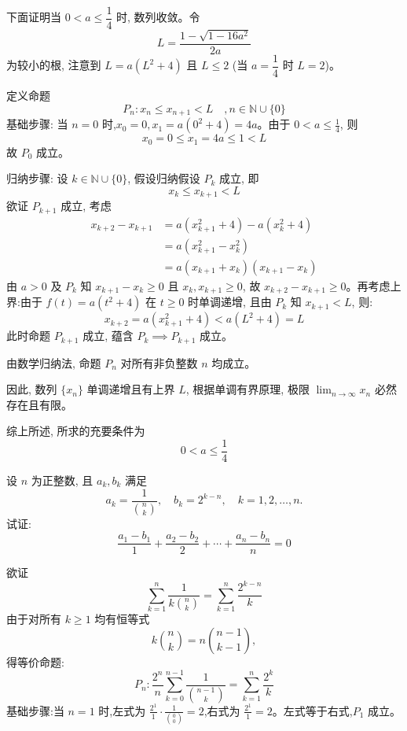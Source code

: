 \begin{questions}
\begin{solution}
        下面证明当 $0 < a \le \dfrac{1}{4}$ 时, 数列收敛。令 
        \[
        L = \frac{1 - \sqrt{1-16a^2}}{2a}
        \]
        为较小的根, 注意到 $L = a(L^2+4)$ 且 $L \le 2$ (当 $a=\dfrac{1}{4}$ 时 $L=2$)。

        定义命题 
        \[
        P_n: x_n \le x_{n+1} < L \quad, n \in \mathbb{N} \cup \{0\}
        \]
        基础步骤: 当 $n=0$ 时,$x_0 = 0,x_1 = a(0^2+4) = 4a$。由于 $0 < a \le \frac{1}{4}$, 则 
        \[
        x_0 = 0 \le x_1 = 4a \le 1 < L 
        \]
        故 $P_0$ 成立。

        归纳步骤: 设 $k \in \mathbb{N} \cup \{0\}$, 假设归纳假设 $P_k$ 成立, 即
        \[
        x_k \le x_{k+1} < L
        \]
        欲证 $P_{k+1}$ 成立, 考虑
        \begin{align}
        x_{k+2} - x_{k+1} &= a(x_{k+1}^2 + 4) - a(x_k^2 + 4) \\
        &= a(x_{k+1}^2 - x_k^2) \\
        &= a(x_{k+1} + x_k)(x_{k+1} - x_k)
        \end{align}
        由 $a>0$ 及 $P_k$ 知 $x_{k+1} - x_k \ge 0$ 且 $x_k, x_{k+1} \ge 0$, 故 $x_{k+2} - x_{k+1} \ge 0$。再考虑上界:由于 $f(t) = a(t^2+4)$ 在 $t \ge 0$ 时单调递增, 且由 $P_k$ 知 $x_{k+1} < L$, 则:
        \[
        x_{k+2} = a(x_{k+1}^2 + 4) < a(L^2 + 4) = L
        \]
        此时命题 $P_{k+1}$ 成立, 蕴含 $P_k \implies P_{k+1}$ 成立。

        由数学归纳法, 命题 $P_n$ 对所有非负整数 $n$ 均成立。

        因此, 数列 $\{x_n\}$ 单调递增且有上界 $L$, 根据单调有界原理, 极限 $\displaystyle \lim_{n\to\infty}x_n$ 必然存在且有限。

        综上所述, 所求的充要条件为 
        \[
        0 < a \le \frac{1}{4}
        \]
    \end{solution}

    \question 设 $n$ 为正整数, 且 $a_k, b_k$ 满足
    \[
    a_{k}=\frac{1}{\binom{n}{k}}, \quad b_{k}=2^{k-n}, \quad k=1,2,\dots,n.
    \]
    试证:
    \[
    \frac{a_1-b_1}{1}+\frac{a_2-b_2}{2}+\cdots+\frac{a_n-b_n}{n}=0 
    \]
    \begin{solution}
        欲证
        \[
        \sum_{k=1}^{n} \frac{1}{k \binom{n}{k}} = \sum_{k=1}^{n} \frac{2^{k-n}}{k}
        \]
        由于对所有 $k \ge 1$ 均有恒等式 
        \[
        k \binom{n}{k} = n \binom{n-1}{k-1},
        \]
        得等价命题:
        \[
        P_n:\frac{2^n}{n} \sum_{k=0}^{n-1} \frac{1}{\binom{n-1}{k}} = \sum_{k=1}^{n} \frac{2^k}{k}
        \]
        基础步骤:当 $n=1$ 时,左式为 $\frac{2^1}{1} \cdot \frac{1}{\binom{0}{0}} = 2$,右式为 $\frac{2^1}{1} = 2$。左式等于右式,$P_1$ 成立。


\end{solution}
\end{questions}
